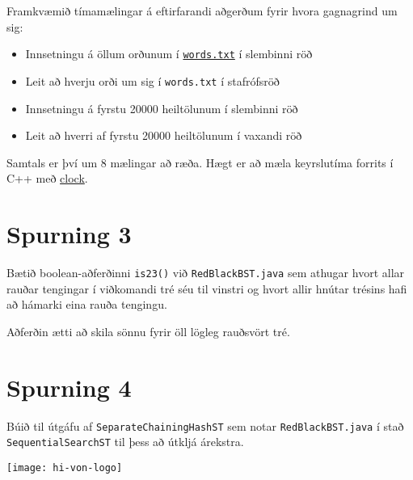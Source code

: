 \documentclass{article}
\begin{document}
Framkvæmið tímamælingar á eftirfarandi aðgerðum fyrir hvora gagnagrind um sig:

\begin{itemize}
 \item Innsetningu á öllum orðunum í \href{http://introcs.cs.princeton.edu/java/data/words.txt}{\texttt{words.txt}} í slembinni röð
 \item Leit að hverju orði um sig í \texttt{words.txt} í stafrófsröð
 \item Innsetningu á fyrstu 20000 heiltölunum í slembinni röð
 \item Leit að hverri af fyrstu 20000 heiltölunum í vaxandi röð
\end{itemize}

Samtals er því um 8 mælingar að ræða. Hægt er að mæla keyrslutíma forrits í C++ með \href{http://www.cplusplus.com/reference/ctime/clock/}{clock}.

\section{Spurning 3}

Bætið boolean-aðferðinni \texttt{is23()} við \texttt{RedBlackBST.java} sem athugar hvort allar rauðar tengingar í viðkomandi tré séu til vinstri og hvort allir hnútar trésins hafi að hámarki eina rauða tengingu.

Aðferðin ætti að skila sönnu fyrir öll lögleg rauðsvört tré.


\section{Spurning 4}

Búið til útgáfu af \texttt{SeparateChainingHashST} sem notar \texttt{RedBlackBST.java} í stað \texttt{SequentialSearchST} til þess að útkljá árekstra.


\vfill
\texttt{[image: hi-von-logo]}
\end{document}
